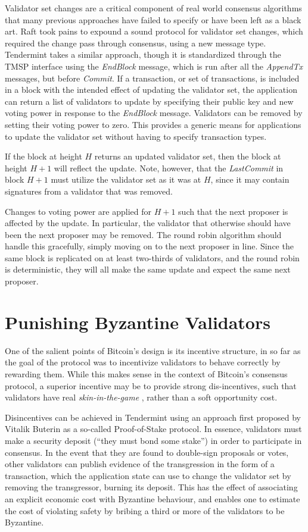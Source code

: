 Validator set changes are a critical component of real world consensus algorithms that many previous approaches have failed to specify 
or have been left as a black art. 
Raft took pains to expound a sound protocol for validator set changes, which required the change pass through consensus, 
using a new message type.
Tendermint takes a similar approach, though it is standardized through the TMSP interface using the \emph{EndBlock} message,
which is run after all the \emph{AppendTx} messages, but before \emph{Commit}.
If a transaction, or set of transactions, is included in a block with the intended effect of updating the validator set,
the application can return a list of validators to update by specifying their public key and new voting power 
in response to the \emph{EndBlock} message.
Validators can be removed by setting their voting power to zero.
This provides a generic means for applications to update the validator set without having to specify transaction types.

If the block at height $H$ returns an updated validator set, 
then the block at height $H+1$ will reflect the update.
Note, however, that the \emph{LastCommit} in block $H+1$
must utilize the validator set as it was at $H$, 
since it may contain signatures from a validator that was removed.

Changes to voting power are applied for $H+1$ such that the next proposer 
is affected by the update. 
In particular, the validator that otherwise should have been the next proposer may be removed.
The round robin algorithm should handle this gracefully, simply moving on to the next proposer in line.
Since the same block is replicated on at least two-thirds of validators, 
and the round robin is deterministic,
they will all make the same update and expect the same next proposer.

\section{Punishing Byzantine Validators}

One of the salient points of Bitcoin's design is its incentive structure, 
in so far as the goal of the protocol was to incentivize validators to behave correctly
by rewarding them. While this makes sense in the context of Bitcoin's consensus protocol,
a superior incentive may be to provide strong dis-incentives, such that validators
have real \emph{skin-in-the-game} \cite{taleb2014skin}, rather than a soft opportunity cost.

Disincentives can be achieved in Tendermint using an approach first proposed by Vitalik Buterin \cite{slasher} as a so-called Proof-of-Stake protocol.
In essence, validators must make a security deposit (``they must bond some stake'')
in order to participate in consensus.
In the event that they are found to double-sign proposals or votes, 
other validators can publish evidence of the transgression in the form of a transaction, 
which the application state can use to change the validator set by removing the transgressor, burning its deposit.
This has the effect of associating an explicit economic cost with Byzantine behaviour, 
and enables one to estimate the cost of violating safety by bribing a third or more of the validators to be Byzantine.

